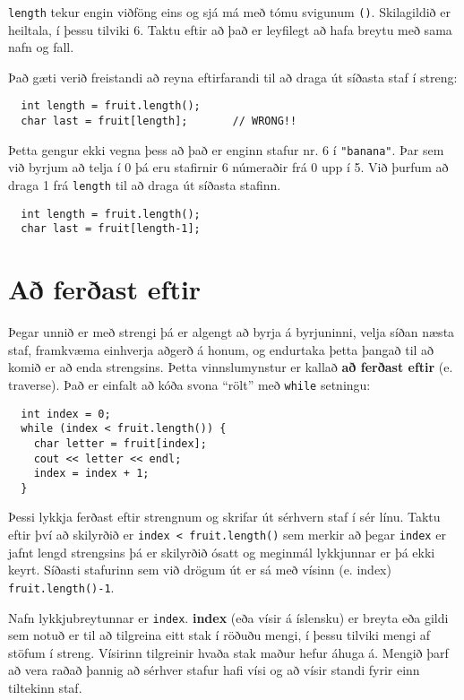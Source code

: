 {\tt length} tekur engin viðföng eins og sjá má með tómu svigunum {\tt ()}.
Skilagildið er heiltala, í þessu tilviki 6.
Taktu eftir að það er leyfilegt að hafa breytu með sama nafn og fall. 

Það gæti verið freistandi að reyna eftirfarandi til að draga út síðasta staf í streng:

\begin{verbatim}
  int length = fruit.length();
  char last = fruit[length];       // WRONG!!
\end{verbatim}
%
Þetta gengur ekki vegna þess að það er enginn stafur nr. 6 í \verb+"banana"+.
Þar sem við byrjum að telja í 0 þá eru stafirnir 6 númeraðir frá 0 upp í 5.
Við þurfum að draga 1 frá {\tt length} til að draga út síðasta stafinn.

\begin{verbatim}
  int length = fruit.length();
  char last = fruit[length-1];
\end{verbatim}

\section{Að ferðast eftir}

Þegar unnið er með strengi þá er algengt að byrja á byrjuninni, velja síðan næsta staf, 
framkvæma einhverja aðgerð á honum, og endurtaka þetta þangað til að komið er að enda strengsins.
Þetta vinnslumynstur er kallað {\bf að ferðast eftir} (e. traverse).
Það er einfalt að kóða svona ``rölt'' með {\tt while} setningu:

\begin{verbatim}
  int index = 0;
  while (index < fruit.length()) {
    char letter = fruit[index];
    cout << letter << endl;
    index = index + 1;
  }
\end{verbatim}
%
Þessi lykkja ferðast eftir strengnum og skrifar út sérhvern staf í sér línu.
Taktu eftir því að skilyrðið er {\tt index < fruit.length()} sem merkir að þegar {\tt index} er jafnt lengd strengsins þá
er skilyrðið ósatt og meginmál lykkjunnar er þá ekki keyrt.
Síðasti stafurinn sem við drögum út er sá með vísinn (e. index) {\tt fruit.length()-1}.


Nafn lykkjubreytunnar er {\tt index}.
{\bf index} (eða vísir á íslensku) er breyta eða gildi sem notuð er til að tilgreina eitt stak í röðuðu mengi, í þessu tilviki mengi af stöfum í streng.
Vísirinn tilgreinir hvaða stak maður hefur áhuga á.
Mengið þarf að vera raðað þannig að sérhver stafur hafi vísi og að vísir standi fyrir einn tiltekinn staf.

